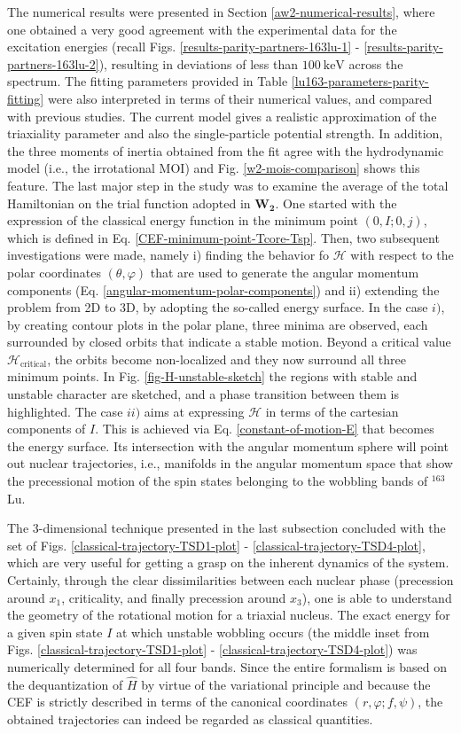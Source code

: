 The numerical results were presented in Section \ref{aw2-numerical-results}, where one obtained a very good agreement with the experimental data for the excitation energies (recall Figs. \ref{results-parity-partners-163lu-1} - \ref{results-parity-partners-163lu-2}), resulting in deviations of less than $100\ \text{keV}$ across the spectrum. The fitting parameters provided in Table \ref{lu163-parameters-parity-fitting} were also interpreted in terms of their numerical values, and compared with previous studies. The current model gives a realistic approximation of the triaxiality parameter and also the single-particle potential strength. In addition, the three moments of inertia obtained from the fit agree with the hydrodynamic model (i.e., the irrotational MOI) and Fig. \ref{w2-mois-comparison} shows this feature. The last major step in the study was to examine the average of the total Hamiltonian on the trial function adopted in $\mathbf{W_2}$. One started with the expression of the classical energy function in the minimum point $(0,I;0,j)$, which is defined in Eq. \ref{CEF-minimum-point-Tcore-Tsp}. Then, two subsequent investigations were made, namely i) finding the behavior fo $\mathcal{H}$ with respect to the polar coordinates $(\theta,\varphi)$ that are used to generate the angular momentum components (Eq. \ref{angular-momentum-polar-components}) and ii) extending the problem from 2D to 3D, by adopting the so-called energy surface. In the case $i)$, by creating contour plots in the polar plane, three minima are observed, each surrounded by closed orbits that indicate a stable motion. Beyond a critical value $\mathcal{H}_\text{critical}$, the orbits become non-localized and they now surround all three minimum points. In Fig. \ref{fig-H-unstable-sketch} the regions with stable and unstable character are sketched, and a phase transition between them is highlighted. The case $ii)$ aims at expressing $\mathcal{H}$ in terms of the cartesian components of $I$. This is achieved via Eq. \ref{constant-of-motion-E} that becomes the energy surface. Its intersection with the angular momentum sphere will point out nuclear trajectories, i.e., manifolds in the angular momentum space that show the precessional motion of the spin states belonging to the wobbling bands of $^{163}$Lu.

The 3-dimensional technique presented in the last subsection concluded with the set of Figs. \ref{classical-trajectory-TSD1-plot} - \ref{classical-trajectory-TSD4-plot}, which are very useful for getting a grasp on the inherent dynamics of the system. Certainly, through the clear dissimilarities between each nuclear phase (precession around $x_1$, criticality, and finally precession around $x_3$), one is able to understand the geometry of the rotational motion for a triaxial nucleus. The exact energy for a given spin state $I$ at which unstable wobbling occurs (the middle inset from Figs. \ref{classical-trajectory-TSD1-plot} - \ref{classical-trajectory-TSD4-plot}) was numerically determined for all four bands. Since the entire formalism is based on the dequantization of $\hat{H}$ by virtue of the variational principle and because the CEF is strictly described in terms of the canonical coordinates $(r,\varphi;f,\psi)$, the obtained trajectories can indeed be regarded as classical quantities.